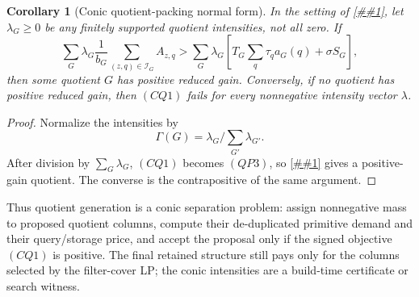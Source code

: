 \documentclass[10pt]{article}
\newcommand{\cref}[1]{\ref{##1}}
\newtheorem{corollary}[theorem]{Corollary}
\theoremstyle{definition}
\begin{document}
\begin{corollary}[Conic quotient-packing normal form]
   \label{cor:conic-quotient-packing}
   In the setting of \cref{lem:quotient-packing-reduced-gain}, let
   \(\lambda_G\ge0\) be any finitely supported quotient intensities, not all zero.
   If
   \[
      \sum_G\lambda_G
      \frac1{b_G}\sum_{(z,q)\in\mathcal I_G}A_{z,q}
      >
      \sum_G\lambda_G
      \left[
         T_G\sum_q\tau_qa_G(q)+\sigma S_G
      \right],
      \tag{CQ1}
   \]
   then some quotient \(G\) has positive reduced gain.  Conversely, if no
   quotient has positive reduced gain, then \((CQ1)\) fails for every
   nonnegative intensity vector \(\lambda\).
\end{corollary}

\begin{proof}
   Normalize the intensities by
   \[
      \Gamma(G)=\lambda_G/\sum_{G'}\lambda_{G'} .
   \]
   After division by \(\sum_G\lambda_G\), \((CQ1)\) becomes \((QP3)\), so
   \cref{lem:quotient-packing-reduced-gain} gives a positive-gain quotient.  The
   converse is the contrapositive of the same argument.
\end{proof}

Thus quotient generation is a conic separation problem: assign nonnegative mass
to proposed quotient columns, compute their de-duplicated primitive demand and
their query/storage price, and accept the proposal only if the signed objective
\((CQ1)\) is positive.  The final retained structure still pays only for the
columns selected by the filter-cover LP; the conic intensities are a build-time
certificate or search witness.
\end{document}
